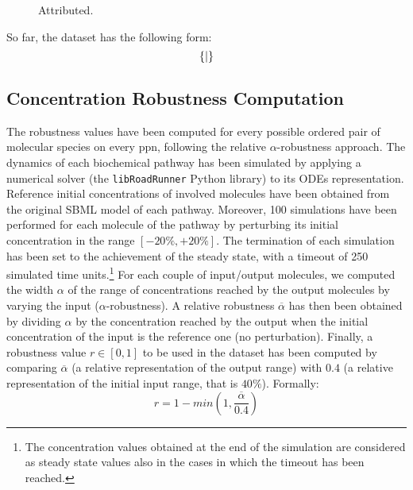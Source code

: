 \begin{figure*}[h!]
    \centering
    \resizebox{.8\textwidth}{!}{}
    \caption{Attributed.}
    \label{fig:pathway-graph-features}
\end{figure*}

So far, the dataset has the following form:
$$\{  \mid  \}$$

\subsection{Concentration Robustness Computation}
The robustness values have been computed for every possible ordered pair of molecular species on every \gls{ppn}, following the relative $\alpha$-robustness approach. The dynamics of each biochemical pathway has been simulated by applying a numerical solver (the \texttt{libRoadRunner} Python library) to its ODEs representation. Reference initial concentrations of involved molecules have been obtained from the original SBML model of each pathway. Moreover, 100 simulations have been performed for each molecule of the pathway by perturbing its initial concentration in the range $[-20\%,+20\%]$. The termination of each simulation has been set to the achievement of the steady state, with a timeout of 250 simulated time units.\footnote{The concentration values obtained at the end of the simulation are considered as steady state values also in the cases in which the timeout has been reached.} For each couple of input/output molecules, we computed the width $\alpha$ of the range of concentrations reached by the output molecules by varying the input ($\alpha$-robustness). A relative robustness $\overline{\alpha}$ has then been obtained by dividing $\alpha$ by the concentration reached by the output when the initial concentration of the input is the reference one (no perturbation). Finally, a robustness value $r \in [0,1]$ to be used in the dataset has been computed by comparing $\overline{\alpha}$ (a relative representation of the output range) with $0.4$ (a relative representation of the initial input range, that is $40\%$). Formally:
\[
r = 1 - min (1,\frac{\overline{\alpha}}{0.4})
\]